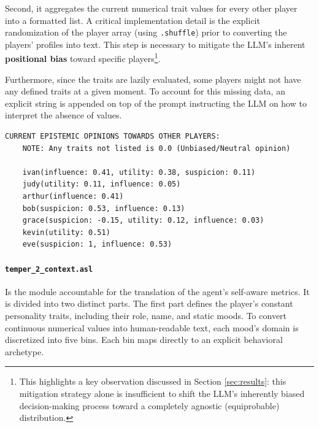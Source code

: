 Second, it aggregates the current numerical trait values for every other player into a formatted list. A critical implementation detail is the explicit randomization of the player array (using \texttt{.shuffle}) prior to converting the players' profiles into text. This step is necessary to mitigate the LLM's inherent \textbf{positional bias} toward specific players\footnote{This highlights a key observation discussed in Section \ref{sec:results}: this mitigation strategy alone is insufficient to shift the LLM's inherently biased decision-making process toward a completely agnostic (equiprobable) distribution.}.

Furthermore, since the traits are lazily evaluated, some players might not have any defined traits at a given moment. To account for this missing data, an explicit string is appended on top of the prompt instructing the LLM on how to interpret the absence of values.


\begin{lstlisting}[frame=single, basicstyle=\footnotesize\ttfamily, breaklines=true, caption={Example of the generated trait context block for a wolf agent. Not each trait of the players is defined, and only the ``alive'' ones are listed.}, label={lst:traits_context}]
    CURRENT EPISTEMIC OPINIONS TOWARDS OTHER PLAYERS:
    NOTE: Any traits not listed is 0.0 (Unbiased/Neutral opinion)
    
    ivan(influence: 0.41, utility: 0.38, suspicion: 0.11)
    judy(utility: 0.11, influence: 0.05)
    arthur(influence: 0.41)
    bob(suspicion: 0.53, influence: 0.13)
    grace(suspicion: -0.15, utility: 0.12, influence: 0.03)
    kevin(utility: 0.51)
    eve(suspicion: 1, influence: 0.53)
\end{lstlisting}


\paragraph{\textbf{\texttt{temper\_2\_context.asl}}} 
Is the module accountable for the translation of the agent's self-aware metrics. It is divided into two distinct parts. The first part defines the player's constant personality traits, including their role, name, and static moods. To convert continuous numerical values into human-readable text, each mood's domain is discretized into five bins. Each bin maps directly to an explicit behavioral archetype.

